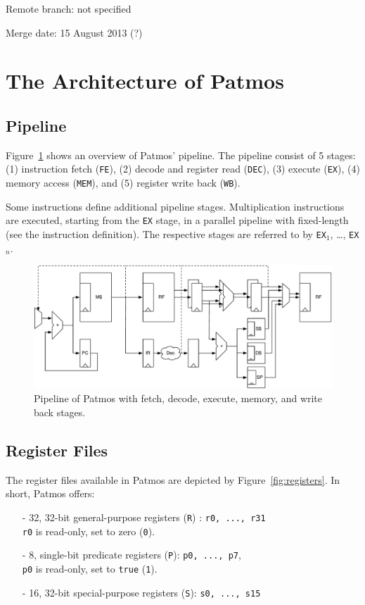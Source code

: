 \documentclass{IEEEtran}
\begin{document}
Remote branch: not specified

Merge date: 15 August 2013 (?)



\section{The Architecture of Patmos}
\label{sec:arch}

\subsection{Pipeline}

Figure~\ref{fig:pipeline} shows an overview of Patmos' pipeline. The pipeline
consist of 5 stages: (1) instruction fetch (\texttt{FE}), (2) decode and
register read (\texttt{DEC}), (3) execute (\texttt{EX}), (4) memory access (\texttt{MEM}), and (5) register write  back (\texttt{WB}).

Some instructions define additional pipeline stages. Multiplication instructions
are executed, starting from the \texttt{EX} stage, in a parallel pipeline with
fixed-length (see the instruction definition). The respective stages are
referred to by \texttt{EX$_1$}, \dots, \texttt{EX$_n$}.

\begin{figure}
    \centering
    \includegraphics[scale=0.6]{fig/pipeline}
    \caption{Pipeline of Patmos with fetch, decode, execute, memory, and write back stages.}\label{fig:pipeline}
\end{figure}


\subsection{Register Files}

The register files available in Patmos are depicted by
Figure~\ref{fig:registers}. In short, Patmos offers:
\begin{itemize}
  \item [-] 32, 32-bit general-purpose registers (\texttt{R}) : \verb!r0, ..., r31! \\
            \verb!r0! is read-only, set to zero (\texttt{0}).
  \item [-] 8, single-bit predicate registers (\texttt{P}): \verb!p0, ..., p7!, \\
            \verb!p0! is read-only, set to \texttt{true} (\texttt{1}).
  \item [-] 16, 32-bit special-purpose registers (\texttt{S}): \verb!s0, ..., s15!
\end{itemize}
\end{document}
